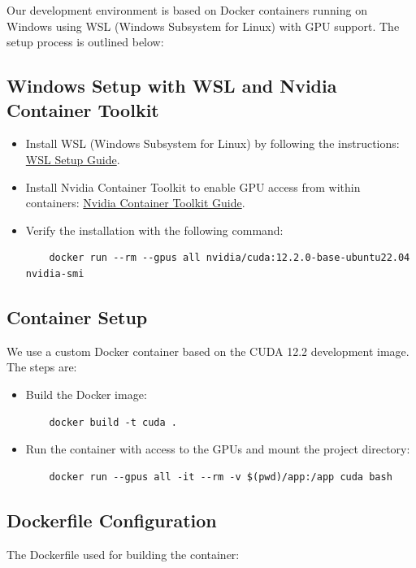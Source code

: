 \documentclass{article}
\begin{document}
Our development environment is based on Docker containers running on Windows using WSL (Windows Subsystem for Linux) with GPU support. The setup process is outlined below:

\subsection{Windows Setup with WSL and Nvidia Container Toolkit}
\begin{itemize}
    \item Install WSL (Windows Subsystem for Linux) by following the instructions: \href{https://learn.microsoft.com/en-us/windows/wsl/setup/environment}{WSL Setup Guide}.
    \item Install Nvidia Container Toolkit to enable GPU access from within containers: \href{https://docs.nvidia.com/datacenter/cloud-native/container-toolkit/latest/install-guide.html}{Nvidia Container Toolkit Guide}.
    \item Verify the installation with the following command:
    \begin{verbatim}
    docker run --rm --gpus all nvidia/cuda:12.2.0-base-ubuntu22.04 nvidia-smi
    \end{verbatim}
\end{itemize}

\subsection{Container Setup}
We use a custom Docker container based on the CUDA 12.2 development image. The steps are:
\begin{itemize}
    \item Build the Docker image:
    \begin{verbatim}
    docker build -t cuda .
    \end{verbatim}
    \item Run the container with access to the GPUs and mount the project directory:
    \begin{verbatim}
    docker run --gpus all -it --rm -v $(pwd)/app:/app cuda bash
    \end{verbatim}
\end{itemize}

\subsection{Dockerfile Configuration}
The Dockerfile used for building the container:
\end{document}

